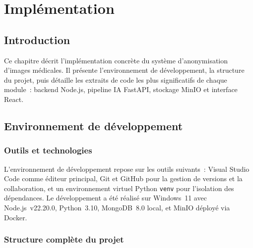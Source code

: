 \chapter{Implémentation}

\section*{Introduction}
Ce chapitre décrit l'implémentation concrète du système d'anonymisation d'images médicales. Il présente l'environnement de développement, la structure du projet, puis détaille les extraits de code les plus significatifs de chaque module~: backend Node.js, pipeline IA FastAPI, stockage MinIO et interface React.

\section{Environnement de développement}

\subsection{Outils et technologies}

L'environnement de développement repose sur les outils suivants~: Visual Studio Code comme éditeur principal, Git et GitHub pour la gestion de versions et la collaboration, et un environnement virtuel Python \texttt{venv} pour l'isolation des dépendances. Le développement a été réalisé sur Windows~11 avec Node.js~v22.20.0, Python~3.10, MongoDB~8.0 local, et MinIO déployé via Docker.

\subsection{Structure complète du projet}

